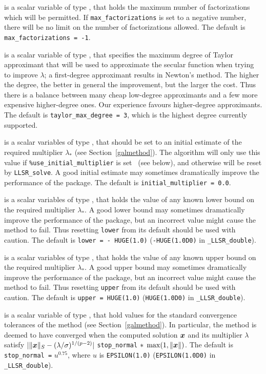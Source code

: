 \documentclass{galahad}
\newcommand{\packagename}{LLSR}
\newcommand{\fullpackagename}{\libraryname\_\packagename}
\begin{document}
\begin{description}
 is a scalar variable of type \integer,
that holds the maximum number of factorizations which will be permitted.
If {\tt max\_factorizations} is set to a negative number, there will be
no limit on the number of factorizations allowed.
The default is {\tt max\_factorizations = -1}.

 is a scalar variable of type \integer,
that specifies the maximum degree of Taylor approximant that will be used
to approximate the secular function when trying to improve $\lambda$;
a first-degree approximant results in Newton's method.
The higher the degree, the better in general the improvement, but the larger the
cost. Thus there is a balance between many cheap low-degree approximants
and a few more expensive higher-degree ones. Our experience favours
higher-degree approximants.
The default is {\tt taylor\_max\_degree = 3}, which is the highest degree
currently supported.

 is a scalar variables of type \realdp, that should
be set to an initial estimate of the required multiplier $\lambda_*$
(see Section~\ref{galmethod}). The algorithm will only use this value
if {\tt \%use\_initial\_multiplier} is set \true\ (see below), and otherwise
will be reset by {\tt \packagename\_solve}. A good initial estimate
may sometimes dramatically improve the performance of the package.
The default is {\tt initial\_multiplier = 0.0}.

 is a scalar variables of type \realdp, that holds the value
of any known lower bound on the required multiplier $\lambda_*$. A good lower
bound may sometimes dramatically improve the performance of the package, but
an incorrect value might cause the method to fail. Thus resetting
{\tt lower} from its default should be used with caution.
The default is {\tt lower = - HUGE(1.0)}
({\tt -HUGE(1.0D0)} in {\tt \fullpackagename\_double}).

 is a scalar variables of type \realdp, that holds the value
of any known upper bound on the required multiplier $\lambda_*$. A good upper
bound may sometimes dramatically improve the performance of the package, but
an incorrect value might cause the method to fail. Thus resetting
{\tt upper} from its default should be used with caution.
The default is {\tt upper = HUGE(1.0)}
({\tt HUGE(1.0D0)} in {\tt \fullpackagename\_double}).

 is a scalar variable of type \realdp,
that hold values for the standard convergence tolerances of the method
(see Section~\ref{galmethod}).
In particular, the method is deemed to have converged when the
computed solution ${\bm{x}}$ and its multiplier $\lambda$ satisfy
$|\|{\bm{x}}\|_S -  (\lambda/\sigma)^{1/(p-2)}|$
{\tt stop\_normal} $\ast \; \max(1,\|{\bm{x}}\|)$.
The default is {\tt stop\_normal =} $u^{0.75}$,
where $u$ is {\tt EPSILON(1.0)} ({\tt EPSILON(1.0D0)} in
{\tt \fullpackagename\_double}).


\end{description}
\end{document}
